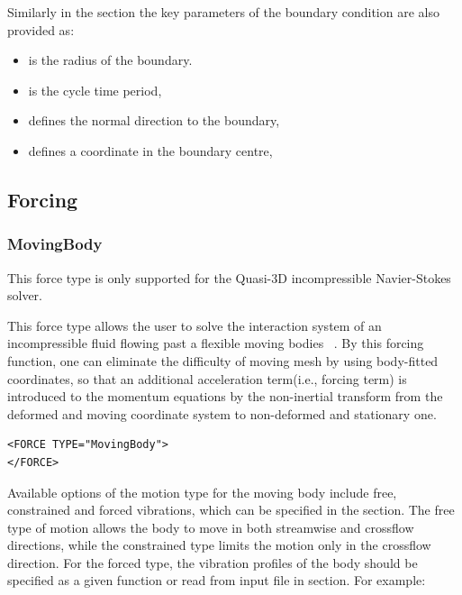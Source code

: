 Similarly in the  section the key parameters of the boundary condition are also provided as:
\begin{itemize}
\item {} is the radius of the boundary.
\item {} is the cycle time period,
\item {} defines the normal direction to the boundary,
\item {}  defines a coordinate in the boundary centre,
\end{itemize}


\subsection{Forcing}
\subsubsection{MovingBody}\label{s:forcing:MovingBody}

\begin{notebox}
This force type is only supported for the Quasi-3D incompressible Navier-Stokes solver.
\end{notebox}

This force type allows the user to solve the interaction system of an incompressible fluid flowing past a flexible moving bodies ~\cite{NeKa97}. By this forcing function, one can eliminate the difficulty of moving mesh by using body-fitted coordinates, so that an additional acceleration term(i.e., forcing term) is introduced to the momentum equations by the non-inertial transform from the deformed and moving coordinate system to non-deformed and stationary one.

\begin{lstlisting}[style=XMLStyle]
<FORCE TYPE="MovingBody">
</FORCE>
\end{lstlisting}

Available options of the motion type for the moving body include free, constrained and forced vibrations, which can be specified in the  section. The free type of motion allows the body to move in both streamwise and crossflow directions, while the constrained type limits the motion only in the crossflow direction. For the forced type, the vibration profiles of the body should be specified as a given function or read from input file in  section. For example:

